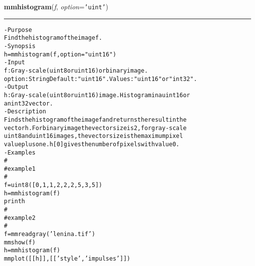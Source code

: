     \begin{boxedminipage}{\textwidth}

    \raggedright \textbf{mmhistogram}(\textit{f}, \textit{option}=\texttt{'\-u\-i\-n\-t\-'\-})

    \vspace{-1.5ex}

    \rule{\textwidth}{0.5\fboxrule}
\begin{alltt}
- Purpose
    Find the histogram of the image f.
- Synopsis
    h = mmhistogram(f, option="uint16")
- Input
    f:      Gray-scale (uint8 or uint16) or binary image.
    option: String Default: "uint16". Values: "uint16" or "int32".
- Output
    h: Gray-scale (uint8 or uint16) image. Histogram in a uint16 or
       an int32 vector.
- Description
    Finds the histogram of the image f and returns the result in the
    vector h . For binary image the vector size is 2, for gray-scale
    uint8 and uint16 images, the vector size is the maximum pixel
    value plus one. h[0] gives the number of pixels with value 0.
- Examples
    \#
    \#   example 1
    \#
    f=uint8([0, 1, 1, 2, 2, 2, 5, 3, 5])
    h=mmhistogram(f)
    print h
    \#
    \#   example 2
    \#
    f=mmreadgray('lenina.tif')
    mmshow(f)
    h=mmhistogram(f)
    mmplot([[h]],[['style', 'impulses']])\end{alltt}

    \vspace{1ex}

    \end{boxedminipage}

    \label{multireg:num_pymorph:mmhmax}
    \vspace{0.5ex}

